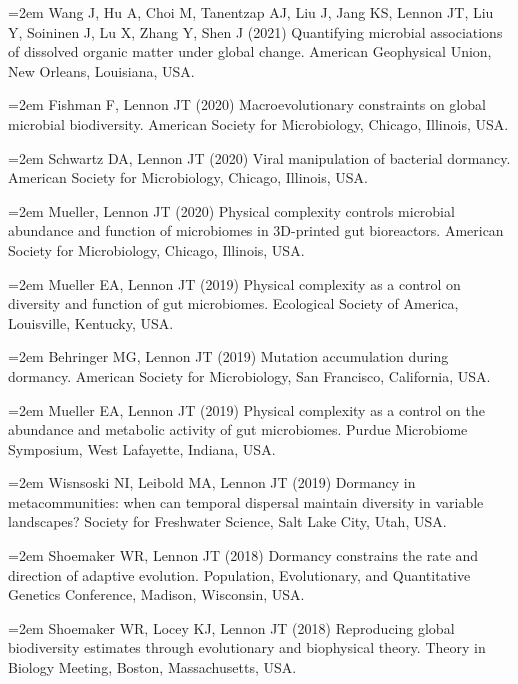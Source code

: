 \documentclass[11pt]{article}
\begin{document}
{\hangindent=2em Wang J, Hu A, Choi M, Tanentzap AJ, Liu J, Jang KS, Lennon JT, Liu Y, Soininen J, Lu X, Zhang Y, Shen J (2021) Quantifying microbial associations of dissolved organic matter under global change. American Geophysical Union, New Orleans, Louisiana, USA. \par

\hangindent=2em Fishman F, Lennon JT (2020) Macroevolutionary constraints on global microbial biodiversity. American Society for Microbiology, Chicago, Illinois, USA. \par

\hangindent=2em Schwartz DA, Lennon JT (2020) Viral manipulation of bacterial dormancy. American Society for Microbiology, Chicago, Illinois, USA. \par

\hangindent=2em Mueller, Lennon JT (2020) Physical complexity controls microbial abundance and function of microbiomes in 3D-printed gut bioreactors. American Society for Microbiology, Chicago, Illinois, USA. \par

\hangindent=2em Mueller EA, Lennon JT (2019) Physical complexity as a control on diversity and function of gut microbiomes. Ecological Society of America, Louisville, Kentucky, USA. \par

\hangindent=2em Behringer MG, Lennon JT (2019) Mutation accumulation during dormancy. American Society for Microbiology, San Francisco, California, USA. \par

\hangindent=2em Mueller EA, Lennon JT (2019) Physical complexity as a control on the abundance and metabolic activity of gut microbiomes. Purdue Microbiome Symposium, West Lafayette, Indiana, USA. \par

\hangindent=2em Wisnsoski NI, Leibold MA, Lennon JT (2019) Dormancy in metacommunities: when can temporal dispersal maintain diversity in variable landscapes? Society for Freshwater Science, Salt Lake City, Utah, USA. \par

\hangindent=2em Shoemaker WR, Lennon JT (2018) Dormancy constrains the rate and direction of adaptive evolution. Population, Evolutionary, and Quantitative Genetics Conference, Madison, Wisconsin, USA. \par

\hangindent=2em Shoemaker WR, Locey KJ, Lennon JT (2018) Reproducing global biodiversity estimates through evolutionary and biophysical theory. Theory in Biology Meeting, Boston, Massachusetts, USA. \par

}
\end{document}
